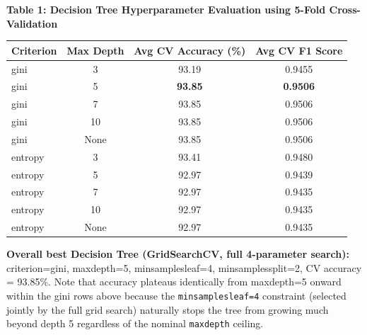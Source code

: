\documentclass[12pt,a4paper]{article}
\newenvironment{fitwidth}
  {\begin{lrbox}{\fitbox}}
  {\end{lrbox}\ifdim\wd\fitbox>\linewidth\resizebox{\linewidth}{!}{\usebox{\fitbox}}\else\usebox{\fitbox}\fi}
\DeclareRobustCommand{\_}{\textunderscore\allowbreak}
\begin{document}
\begin{center}
\begin{minipage}{\linewidth}\centering
\textbf{Table 1: Decision Tree Hyperparameter Evaluation using 5-Fold Cross-Validation}\par\smallskip
\begin{fitwidth}
\begin{tabular}{lccc}
\toprule
Criterion & Max Depth & Avg CV Accuracy (\%) & Avg CV F1 Score \\
\midrule
gini    & 3    & 93.19 & 0.9455 \\
gini    & 5    & \textbf{93.85} & \textbf{0.9506} \\
gini    & 7    & 93.85 & 0.9506 \\
gini    & 10   & 93.85 & 0.9506 \\
gini    & None & 93.85 & 0.9506 \\
entropy & 3    & 93.41 & 0.9480 \\
entropy & 5    & 92.97 & 0.9439 \\
entropy & 7    & 92.97 & 0.9435 \\
entropy & 10   & 92.97 & 0.9435 \\
entropy & None & 92.97 & 0.9435 \\
\bottomrule
\end{tabular}
\end{fitwidth}
\end{minipage}
\end{center}

\vspace{0.2cm}
\noindent \textbf{Overall best Decision Tree (GridSearchCV, full 4-parameter
search):} criterion=gini, max\_depth=5, min\_samples\_leaf=4,
min\_samples\_split=2, CV accuracy = 93.85\%. Note that accuracy plateaus
identically from max\_depth=5 onward within the gini rows above because the
\texttt{min\_samples\_leaf=4} constraint (selected jointly by the full grid
search) naturally stops the tree from growing much beyond depth 5 regardless
of the nominal \texttt{max\_depth} ceiling.
\end{document}
